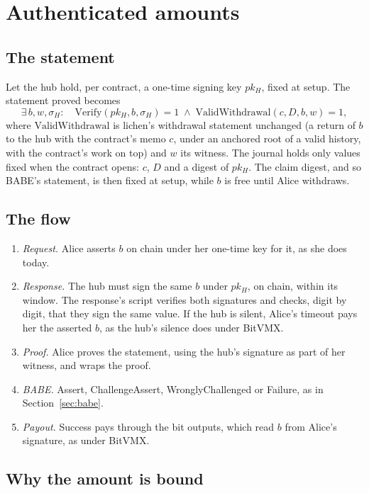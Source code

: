 \documentclass[11pt]{article}
\begin{document}
\section{Authenticated amounts}
\label{sec:auth}

\subsection{The statement}

Let the hub hold, per contract, a one-time signing key $pk_H$, fixed at
setup. The statement proved becomes
\[
  \exists\, b, w, \sigma_H:\quad
  \mathrm{Verify}(pk_H, b, \sigma_H) = 1 \;\wedge\;
  \mathrm{ValidWithdrawal}(c, D, b, w) = 1,
\]
where $\mathrm{ValidWithdrawal}$ is lichen's withdrawal statement
unchanged (a return of $b$ to the hub with the contract's memo $c$, under
an anchored root of a valid history, with the contract's work on top)
and $w$ its witness. The journal holds only values fixed when the
contract opens: $c$, $D$ and a digest of $pk_H$. The claim digest, and
so BABE's statement, is then fixed at setup, while $b$ is free until
Alice withdraws.

\subsection{The flow}

\begin{enumerate}[leftmargin=1.5em]
\item \emph{Request.} Alice asserts $b$ on chain under her one-time key
  for it, as she does today.
\item \emph{Response.} The hub must sign the same $b$ under $pk_H$, on
  chain, within its window. The response's script verifies both
  signatures and checks, digit by digit, that they sign the same value.
  If the hub is silent, Alice's timeout pays her the asserted $b$, as
  the hub's silence does under BitVMX.
\item \emph{Proof.} Alice proves the statement, using the hub's
  signature as part of her witness, and wraps the proof.
\item \emph{BABE.} Assert, ChallengeAssert, WronglyChallenged or
  Failure, as in Section~\ref{sec:babe}.
\item \emph{Payout.} Success pays through the bit outputs, which read
  $b$ from Alice's signature, as under BitVMX.
\end{enumerate}

\subsection{Why the amount is bound}
\label{sec:binding}
\end{document}
